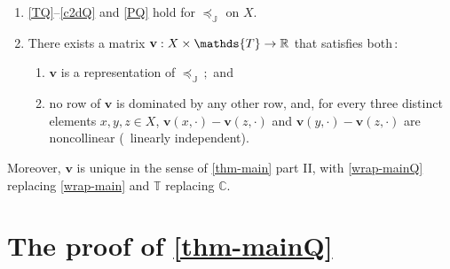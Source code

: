 \documentclass[12pt,a4paper,twoside]{article}
\newcommand{\gsii}{$\textup{GS03}$}
\newcommand{\preceqb}{\mathbin{\preceq}}
\newcommand{\countof}{\mathbin{\#}\hskip1pt}
\newcommand{\ext}{\mathrel{\mc R}}
\newcommand{\sext}{\mathrel{\mc P}}
\newcommand{\next}{\mathrel{\mc I}}
\newcommand{\sextb}{\mathbin{\mc P}}
\newcommand{\mbbc}{{\mathds C}}
\newcommand{\mbbt}{{\mathds {T}}}
\newcommand{\mbbj}{\mathds J}
\newcommand{\xy}{{(x, y)}}
\begin{document}
\begin{appendices}
\begin{theorem}
\begin{enumerate}[label=\textup{(\ref{thm-mainQ}.\roman*)}]

\item\label{ax-mainQ}

 \ref{TQ}--\ref{c2dQ} and
 \ref{PQ} hold for   $\preceqb _ {\mbbj}$ on $X$.
 
    
\item\label{wrap-mainQ} There exists a matrix
  $\mathbf{v} : X \times \mbbt \rightarrow \R$ that satisfies both$\,:$
  \begin{enumerate}[label=\textup{(\ref{thm-mainQ}.\alph*)}]
  \item\label{rep-mainQ}
  $\mathbf{v}$ is a representation of $\preceq _ {\mbbj}\,;$ and

\item\label{rows-mainQ} no row of
  $\mathbf{v}$ is dominated by any other row, and, for every three distinct elements
  $x,y, z \in X$, $\mathbf{v}(x,\cdot)-\mathbf{v}(z,\cdot)
 $ and $\mathbf{v}(y,\cdot)-\mathbf{v}(z,\cdot)$ are noncollinear (\ie\ linearly independent).
\end{enumerate}
\end{enumerate}
Moreover, $\mathbf{v}$ is unique in the sense of \cref{thm-main} part II, with
\ref{wrap-mainQ} replacing \ref{wrap-main} and $\mbbt$ replacing $\mbbc$.
\end{theorem}


\section{The proof of \cref{thm-mainQ}}\label{sec-proof-mainQ} 




\end{appendices}
\end{document}
